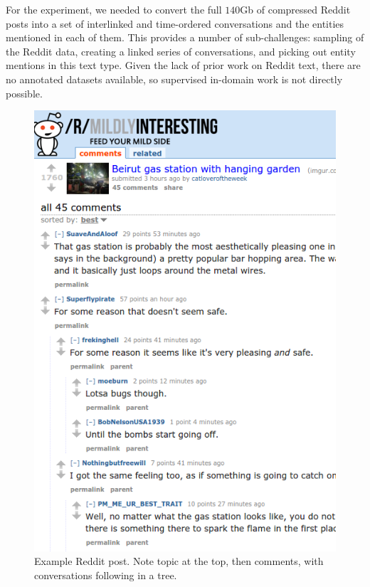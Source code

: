 \documentclass[sigconf]{acmart}
\begin{document}
For the experiment, we needed to convert the full $140$Gb of compressed Reddit posts into a set of interlinked and time-ordered conversations and the entities mentioned in each of them.
This provides a number of sub-challenges: sampling of the Reddit data, creating a linked series of conversations, and picking out entity mentions in this text type.
Given the lack of prior work on Reddit text, there are no annotated datasets available, so supervised in-domain work is not directly possible.

\begin{figure}
\centering
\includegraphics[width=0.7\columnwidth]{reddit-example.png}
\caption{Example Reddit post. Note topic at the top, then comments, with conversations following in a tree.}
\label{fig:reddit-example}
\end{figure}
\end{document}
